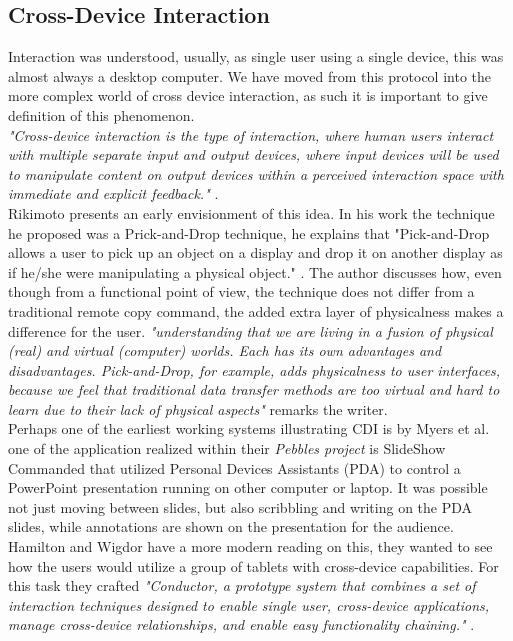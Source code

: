\subsection{Cross-Device Interaction}
Interaction was understood, usually, as single user using a single device, this was almost always a desktop computer\cite{Levin:2014}. We have moved from this protocol into the more complex world of cross device interaction, as such it is important to give definition of this phenomenon.\\

\emph{"Cross-device interaction is the type of interaction, where human users interact with multiple separate input and output devices, where input devices will be used to manipulate content on output devices within a perceived interaction space with immediate and explicit feedback."} \cite{Scharf:2013}.\\

Rikimoto presents an early envisionment of this idea. In his work the technique he proposed was a Prick-and-Drop technique, he explains that "Pick-and-Drop allows a user to pick up an object on a display and drop it on another display as if he/she were manipulating a physical object." \cite{Rekimoto:1997}. The author discusses how, even though from a functional point of view, the technique does not differ from a traditional remote copy command, the added extra layer of physicalness makes a difference for the user. \emph{"understanding that we are living in a fusion of physical (real) and virtual (computer) worlds. Each has its own advantages and disadvantages. Pick-and-Drop, for example, adds physicalness to user interfaces, because we feel that traditional data transfer methods are too virtual and hard to learn due to their lack of physical aspects"} \cite{Rekimoto:1997} remarks the writer.\\
Perhaps one of the earliest working systems illustrating CDI is by Myers et al.
\cite{Myers:2001} one of the application realized within their \emph{Pebbles project} is SlideShow Commanded that utilized Personal Devices Assistants (PDA) to control a PowerPoint presentation running on other computer or laptop.
It was possible not just moving between slides, but also scribbling and writing on the PDA slides, while annotations are shown on the presentation for the audience.\\

Hamilton and Wigdor have a more modern reading on this, they wanted to see how the users would utilize a group of tablets with cross-device capabilities. For this task they crafted\emph{ "Conductor, a prototype system that combines a set of interaction techniques designed to enable single user, cross-device applications, manage cross-device relationships, and enable easy functionality chaining."} \cite{Hamilton:2014}.\\

